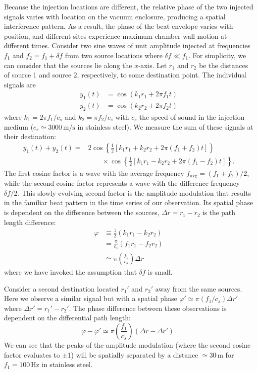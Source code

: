 Because the injection locations are different, the relative phase of the two injected signals varies with location on the vacuum enclosure, producing a spatial interference pattern.
As a result, the phase of the beat envelope varies with position, and different sites experience maximum chamber wall motion at different times.
Consider two sine waves of unit amplitude injected at frequencies $f_1$ and $f_2 = f_1 + \delta f$ from two source locations where $\delta f \ll f_1$.
For simplicity, we can consider that the sources lie along the $x$-axis.
Let $r_1$ and $r_2$ be the distances of source 1 and source 2, respectively, to some destination point.
The individual signals are
\begin{align}
	y_1(t) &= \cos(k_1 r_1 + 2 \pi f_1 t)\\
	y_2(t) &= \cos(k_2 r_2 + 2 \pi f_2 t)
\end{align}
where $k_1 = 2 \pi f_1 / c_s$ and $k_2 = \pi f_2 / c_s$ with $c_s$ the speed of sound in the injection medium ($c_s \simeq 3000\,\mathrm{m/s}$ in stainless steel).
We measure the sum of these signals at their destination:
\begin{equation}
	\begin{split}
	  y_1(t) + y_2(t) =
		& 2 \cos \left\{ \frac{1}{2} \left[k_1 r_1 + k_2 r_2 + 2 \pi (f_1 + f_2) t \right] \right\} \\
		&\qquad \times \cos \left\{ \frac{1}{2} \left[k_1 r_1 - k_2 r_2 + 2 \pi (f_1 - f_2) t \right] \right\}.
	\end{split}
\end{equation}
The first cosine factor is a wave with the average frequency $f_{\mathrm{avg}} = (f_1 + f_2) / 2$, while the second cosine factor represents a wave with the difference frequency $\delta f / 2$.
This slowly evolving second factor is the amplitude modulation that results in the familiar beat pattern in the time series of our observation.
Its spatial phase is dependent on the difference between the sources, $\Delta r = r_1 - r_2$ is the path length difference:
\begin{align}
	\varphi &\equiv \frac{1}{2} (k_1 r_1 - k_2 r_2) \\
	&= \frac{\pi}{c_s} (f_1 r_1 - f_2 r_2) \\
	&\simeq \pi \left( \frac{f_1}{c_s} \right) \Delta r
\end{align}
where we have invoked the assumption that $\delta f$ is small.

Consider a second destination located $r_1'$ and $r_2'$ away from the same sources.
Here we observe a similar signal but with a spatial phase $\varphi' \simeq \pi (f_1 / c_s) \Delta r'$ where $\Delta r' = r_1' - r_2'$.
The phase difference between these observations is dependent on the differential path length:
\begin{equation}
	\varphi - \varphi' \simeq \pi \left( \frac{f_1}{c_s} \right) (\Delta r - \Delta r').
\end{equation}
We can see that the peaks of the amplitude modulation (where the second cosine factor evaluates to $\pm1$) will be spatially separated by a distance $\simeq 30$\,m for $f_1 = 100$\,Hz in stainless steel.

